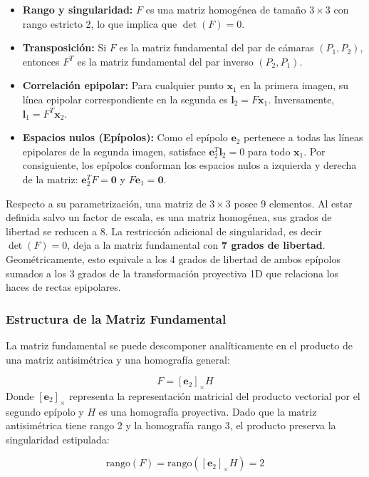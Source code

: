 \documentclass[
10pt, %
a4paper, %
oneside, %
headinclude,footinclude, %
BCOR=5mm, %
]{scrartcl}
\begin{document}
\begin{itemize}
    \item \textbf{Rango y singularidad:} $F$ es una matriz homogénea de tamaño $3 \times 3$ con rango estricto 2, lo que implica que $\det(F) = 0$.
    \item \textbf{Transposición:} Si $F$ es la matriz fundamental del par de cámaras $(P_1, P_2)$, entonces $F^{T}$ es la matriz fundamental del par inverso $(P_2, P_1)$.
    \item \textbf{Correlación epipolar:} Para cualquier punto $\mathbf{x}_1$ en la primera imagen, su línea epipolar correspondiente en la segunda es $\mathbf{l}_2 = F \mathbf{x}_1$. Inversamente, $\mathbf{l}_1 = F^{T} \mathbf{x}_2$.
    \item \textbf{Espacios nulos (Epípolos):} Como el epípolo $\mathbf{e}_2$ pertenece a todas las líneas epipolares de la segunda imagen, satisface $\mathbf{e}_2^{T} \mathbf{l}_2 = 0$ para todo $\mathbf{x}_1$. Por consiguiente, los epípolos conforman los espacios nulos a izquierda y derecha de la matriz: $\mathbf{e}_2^{T} F = \mathbf{0}$ y $F \mathbf{e}_1 = \mathbf{0}$.
\end{itemize}

Respecto a su parametrización, una matriz de $3 \times 3$ posee 9 elementos. Al estar definida salvo un factor de escala, es una matriz homogénea, sus grados de libertad se reducen a 8. La restricción adicional de singularidad, es decir $\det(F)=0$, deja a la matriz fundamental con \textbf{7 grados de libertad}. Geométricamente, esto equivale a los 4 grados de libertad de ambos epípolos sumados a los 3 grados de la transformación proyectiva 1D que relaciona los haces de rectas epipolares.

\subsubsection{Estructura de la Matriz Fundamental}
La matriz fundamental se puede descomponer analíticamente en el producto de una matriz antisimétrica y una homografía general:

\[
    F = [\mathbf{e}_2]_\times H
\]
Donde $[\mathbf{e}_2]_\times$ representa la representación matricial del producto vectorial por el segundo epípolo y $H$ es una homografía proyectiva. Dado que la matriz antisimétrica tiene rango 2 y la homografía rango 3, el producto preserva la singularidad estipulada:

\[
    \text{rango}(F) = \text{rango}([\mathbf{e}_2]_\times H) = 2
\]
\end{document}
